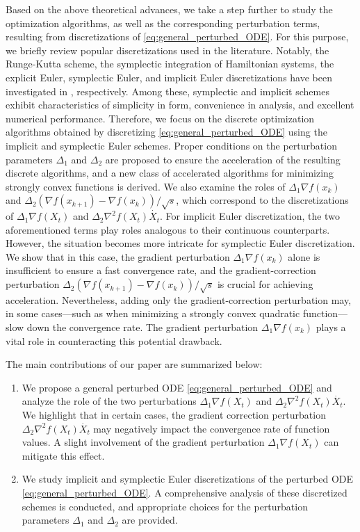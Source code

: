 \documentclass[11pt]{article}
\newcommand{\1}{\mathbf 1}
\numberwithin{equation}{section}
\begin{document}
Based on the above theoretical advances, we take a step further to study the optimization algorithms, as well as the corresponding perturbation terms, resulting from discretizations of \eqref{eq:general_perturbed_ODE}. For this purpose, we briefly review popular discretizations used in the literature. 
Notably, the Runge-Kutta scheme, the symplectic integration of Hamiltonian systems, the explicit Euler, symplectic Euler, and implicit Euler discretizations have been investigated in  \cite{Zhang_2018_direct, Betancourt_2018_symplectic,  Shi_2019_acceleration, Zhang_2021_revisiting}, respectively. Among these, {symplectic and implicit schemes} exhibit characteristics of simplicity in form, convenience in analysis, and excellent numerical performance. Therefore, we focus on the discrete optimization algorithms obtained by discretizing \eqref{eq:general_perturbed_ODE} using the implicit and symplectic Euler schemes.
Proper conditions on the perturbation parameters $\Delta_1$ and $\Delta_2$  
are proposed to ensure the acceleration of the resulting discrete algorithms, and a new class of accelerated algorithms for minimizing strongly convex functions is derived. We also examine the roles of $\Delta_1\nabla f(x_{k})$ and $\Delta_2(\nabla f(x_{k+1})-\nabla f(x_k))/\sqrt{s}$, which correspond to the discretizations of $\Delta_1\nabla f(X_t)$ and $\Delta_2\nabla^2 f(X_t)\dot{X_t}$. 
For implicit Euler discretization, the two aforementioned terms play roles analogous to their continuous counterparts. However, the situation becomes more intricate for symplectic Euler discretization. We show that in this case, the gradient perturbation $\Delta_1\nabla f(x_k)$ alone is insufficient to ensure a fast convergence rate, and the gradient-correction perturbation $\Delta_2 (\nabla f(x_{k+1})-\nabla f(x_k))/\sqrt{s}$ is crucial for achieving acceleration. Nevertheless, adding only the gradient-correction perturbation may, in some cases—such as when minimizing a strongly convex quadratic function—slow down the convergence rate. The gradient perturbation $\Delta_1 \nabla f(x_k)$ plays a vital role in counteracting this potential drawback.

The main contributions of our paper are summarized below:
\begin{enumerate}
    \item We propose a general perturbed ODE \eqref{eq:general_perturbed_ODE} and analyze the role of the two perturbations $\Delta_1\nabla f(X_t)$ and $\Delta_2\nabla^2 f(X_t)\dot{X_t}$. We highlight that in certain cases, the gradient correction perturbation $\Delta_2\nabla^2 f(X_t)\dot{X_t}$ may negatively impact the convergence rate of function values. A slight involvement of the gradient perturbation $\Delta_1\nabla f(X_t)$ can mitigate this effect.
    \item We study implicit and symplectic Euler discretizations of the perturbed ODE \eqref{eq:general_perturbed_ODE}. A comprehensive analysis of these discretized schemes is conducted, and appropriate choices for the perturbation parameters $\Delta_1$ and $\Delta_2$ are provided.
    
\end{enumerate}
\end{document}
